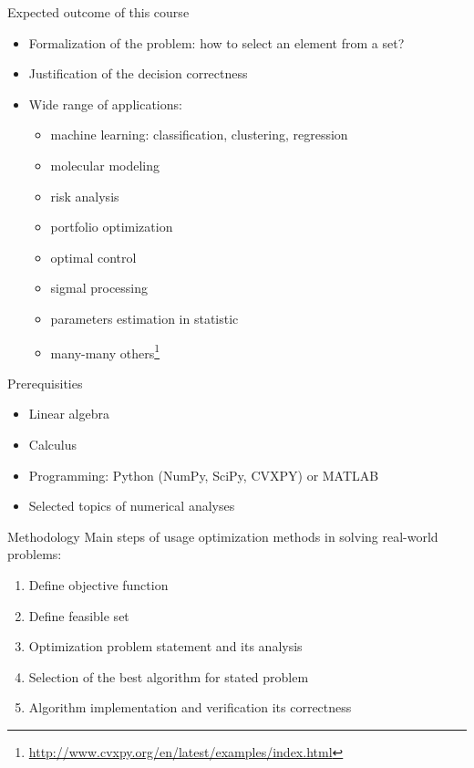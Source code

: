 \documentclass[12pt]{beamer}
\begin{document}
\begin{frame}{Expected outcome of this course}
\begin{itemize}
\item Formalization of the problem: how to select an element from a set?
\item Justification of the decision correctness
\item Wide range of applications:
\begin{itemize}
\item machine learning: classification, clustering, regression
\item molecular modeling
\item risk analysis
\item portfolio optimization
\item optimal control
\item sigmal processing
\item parameters estimation in statistic
\item many-many others\footnote{\url{http://www.cvxpy.org/en/latest/examples/index.html}}
\end{itemize}
\end{itemize}
\end{frame}

\begin{frame}{Prerequisities}
\begin{itemize}
\item Linear algebra
\item Calculus
\item Programming: Python (NumPy, SciPy, CVXPY) or MATLAB
\item Selected topics of numerical analyses
\end{itemize}
\end{frame}

\begin{frame}{Methodology}
Main steps of usage optimization methods in solving real-world problems:
\begin{enumerate}
\item Define objective function
\item Define feasible set
\item Optimization problem statement and its analysis
\item Selection of the best algorithm for stated problem
\item Algorithm implementation and verification its correctness
\end{enumerate}

\end{frame}
\end{document}

